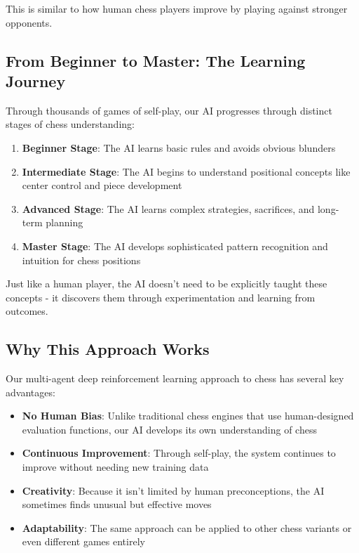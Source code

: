 \documentclass[11pt]{article}
\begin{document}
This is similar to how human chess players improve by playing against stronger opponents.

\subsection{From Beginner to Master: The Learning Journey}

Through thousands of games of self-play, our AI progresses through distinct stages of chess understanding:

\begin{enumerate}
    \item \textbf{Beginner Stage}: The AI learns basic rules and avoids obvious blunders
    \item \textbf{Intermediate Stage}: The AI begins to understand positional concepts like center control and piece development
    \item \textbf{Advanced Stage}: The AI learns complex strategies, sacrifices, and long-term planning
    \item \textbf{Master Stage}: The AI develops sophisticated pattern recognition and intuition for chess positions
\end{enumerate}

Just like a human player, the AI doesn't need to be explicitly taught these concepts - it discovers them through experimentation and learning from outcomes.

\subsection{Why This Approach Works}

Our multi-agent deep reinforcement learning approach to chess has several key advantages:

\begin{itemize}
    \item \textbf{No Human Bias}: Unlike traditional chess engines that use human-designed evaluation functions, our AI develops its own understanding of chess
    \item \textbf{Continuous Improvement}: Through self-play, the system continues to improve without needing new training data
    \item \textbf{Creativity}: Because it isn't limited by human preconceptions, the AI sometimes finds unusual but effective moves
    \item \textbf{Adaptability}: The same approach can be applied to other chess variants or even different games entirely
\end{itemize}
\end{document}
